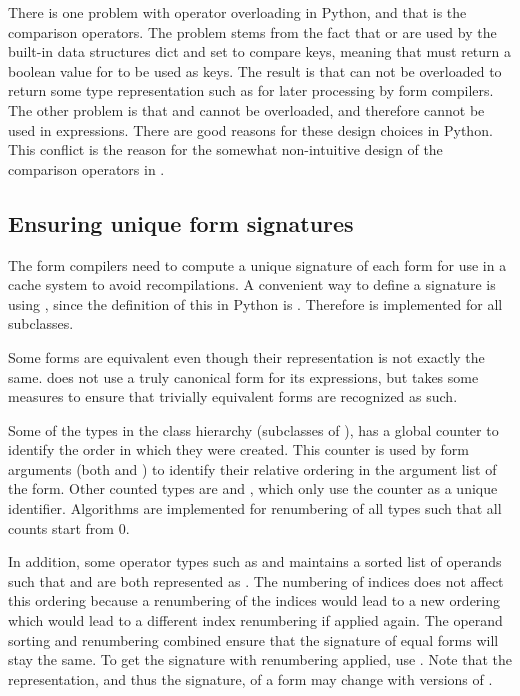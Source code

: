 There is one problem with operator overloading in Python, and that is
the comparison operators. The problem stems from the fact that
 or  are used by the built-in
data structures dict and set to compare keys, meaning that  must return a boolean value for  to be used as
keys. The result is that  can not be overloaded to
return some  type representation such as  for later processing by form compilers.  The other problem is
that  and  cannot be overloaded, and therefore
cannot be used in  expressions.  There are good
reasons for these design choices in Python.  This conflict is the
reason for the somewhat non-intuitive design of the comparison
operators in \ufl{}.

\subsection{Ensuring unique form signatures} \label{ufl:sec:signatures}

The form compilers need to compute a unique signature of each form for
use in a cache system to avoid recompilations.  A convenient way to
define a signature is using , since the definition
of this in Python is .  Therefore
 is implemented for all  subclasses.

Some forms are equivalent even though their representation is not
exactly the same. \ufl{} does not use a truly canonical form for its
expressions, but takes some measures to ensure that trivially
equivalent forms are recognized as such.

Some of the types in the  class hierarchy (subclasses of
), has a global counter to identify the order in which
they were created.  This counter is used by form arguments (both
 and ) to identify their relative
ordering in the argument list of the form.  Other counted types are
 and , which only use the counter as a
unique identifier.  Algorithms are implemented for renumbering of all
 types such that all counts start from 0.

In addition, some operator types such as  and
 maintains a sorted list of operands such that
 and  are both represented as . The numbering of indices does not affect this ordering because a
renumbering of the indices would lead to a new ordering which would
lead to a different index renumbering if applied again.  The operand
sorting and renumbering combined ensure that the signature of equal
forms will stay the same.  To get the signature with renumbering
applied, use . Note that the
representation, and thus the signature, of a form may change with
versions of \ufl{}.

